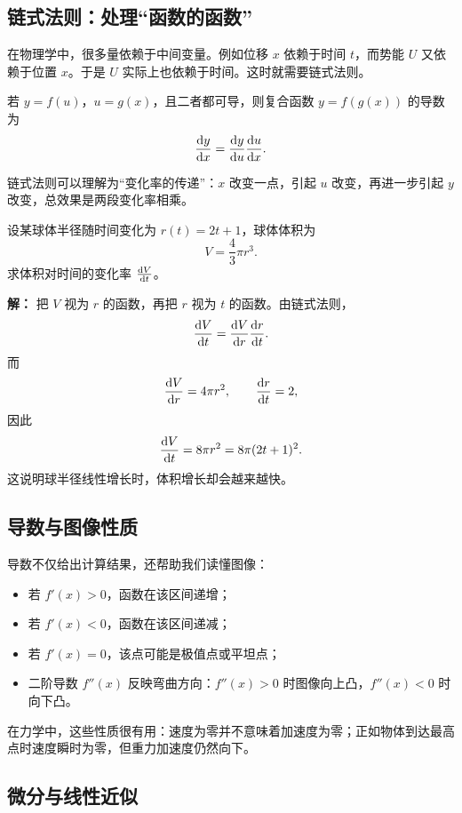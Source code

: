 \subsection{链式法则：处理“函数的函数”}

在物理学中，很多量依赖于中间变量。例如位移 $x$ 依赖于时间 $t$，而势能 $U$ 又依赖于位置 $x$。于是 $U$ 实际上也依赖于时间。这时就需要链式法则。

\begin{theorem}[链式法则]
若 $y=f(u)$，$u=g(x)$，且二者都可导，则复合函数 $y=f(g(x))$ 的导数为
\[
  \dv{y}{x} = \dv{y}{u}\dv{u}{x}.
\]
\end{theorem}

链式法则可以理解为“变化率的传递”：$x$ 改变一点，引起 $u$ 改变，再进一步引起 $y$ 改变，总效果是两段变化率相乘。

\begin{example}
设某球体半径随时间变化为 $r(t)=2t+1$，球体体积为
\[
  V = \frac{4}{3}\pi r^3.
\]
求体积对时间的变化率 $\dv{V}{t}$。

\textbf{解：} 把 $V$ 视为 $r$ 的函数，再把 $r$ 视为 $t$ 的函数。由链式法则，
\[
  \dv{V}{t} = \dv{V}{r}\dv{r}{t}.
\]
而
\[
  \dv{V}{r} = 4\pi r^2, \qquad \dv{r}{t}=2,
\]
因此
\[
  \dv{V}{t} = 8\pi r^2 = 8\pi(2t+1)^2.
\]
这说明球半径线性增长时，体积增长却会越来越快。
\end{example}

\subsection{导数与图像性质}

导数不仅给出计算结果，还帮助我们读懂图像：
\begin{itemize}
  \item 若 $f'(x)>0$，函数在该区间递增；
  \item 若 $f'(x)<0$，函数在该区间递减；
  \item 若 $f'(x)=0$，该点可能是极值点或平坦点；
  \item 二阶导数 $f''(x)$ 反映弯曲方向：$f''(x)>0$ 时图像向上凸，$f''(x)<0$ 时向下凸。
\end{itemize}

在力学中，这些性质很有用：速度为零并不意味着加速度为零；正如物体到达最高点时速度瞬时为零，但重力加速度仍然向下。

\subsection{微分与线性近似}

